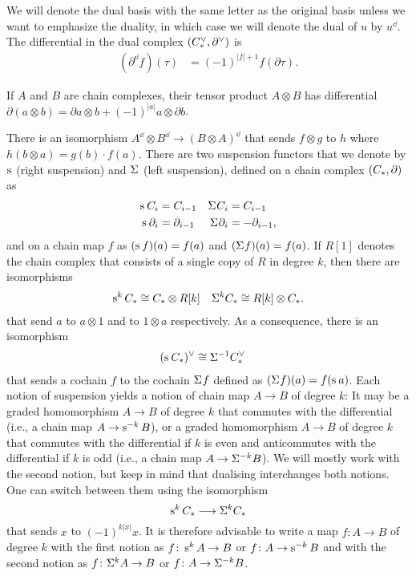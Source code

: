 We will denote the dual basis with the same letter as the original basis unless we want to emphasize the duality, in which case we will denote the dual of $u$ by $u^\dd$. The differential in the dual complex $(\ucocadenas,\partial^\dd)$ is
\begin{align*}
	(\partial^\dd f)(\tau) &= (-1)^{|f|+1} f(\partial \tau). %
\end{align*}
\begin{convention}
	If $A$ and $B$ are chain complexes, their tensor product $A\otimes B$ has differential $\partial(a\otimes b) = \partial a\otimes b + (-1)^{|a|}a\otimes \partial b$.
\end{convention}
	There is an isomorphism $A^\dd\otimes B^\dd\to (B\otimes A)^{\dd}$ that sends $f\otimes g$ to $h$ where $h(b\otimes a) = g(b)\cdot f(a)$. There are two suspension functors that we denote by $\sus{}$ (right suspension) and $\susp{}$ (left suspension), defined on a chain complex $(\ucadenas,\partial)$ as
\begin{align*}
	\sus{} \ucadenas[i] &= \ucadenas[i-1] & \susp{} \ucadenas[i] &= \ucadenas[i-1] \\
	\sus{} \partial_i &= \partial_{i-1} & \susp{} \partial_i &= -\partial_{i-1},
\end{align*}
and on a chain map $f$ as $(\sus{}f)(a) = f(a)$ and $(\susp{} f)(a) = f(a)$. If $R[1]$ denotes the chain complex that consists of a single copy of $R$ in degree $k$, then there are isomorphisms
\begin{align*}
	\sus{k} \ucadenas &\cong \ucadenas\otimes R[k] & \susp{k} \ucadenas \cong R[k]\otimes \ucadenas.
\end{align*}
that send $a$ to $a\otimes 1$ and to $1\otimes a$ respectively. As a consequence, there is an isomorphism
\begin{align*}
(\sus{}\ucadenas )^\dd &\cong \susp{-1}\ucocadenas
\end{align*}
that sends a cochain $f$ to the cochain $\susp{}f$ defined as $(\susp{}f)(a) = f(\sus{}a)$.
Each notion of suspension yields a notion of chain map $A\to B$ of degree $k$: It may be a graded homomorphism $A\to B$ of degree $k$ that commutes with the differential (i.e., a chain map $A\to \sus{-k} B$), or a graded homomorphism $A\to B$ of degree $k$ that commutes with the differential if $k$ is even and anticommutes with the differential if $k$ is odd (i.e., a chain map $A\to \susp{-k}B$). We will mostly work with the second notion, but keep in mind that dualising interchanges both notions. One can switch between them using the isomorphism
\[
	\sus{k}\ucadenas \lra \susp{k}\ucadenas
\]
that sends $x$ to $(-1)^{k|x|}x$. It is therefore advisable to write a map $f\colon A\to B$ of degree $k$ with the first notion as $f\colon \sus{k}A\to B$ or $f\colon A\to \sus{-k}B$ and with the second notion as $f\colon \susp{k}A\to B$ or $f\colon A\to \susp{-k}B$.

